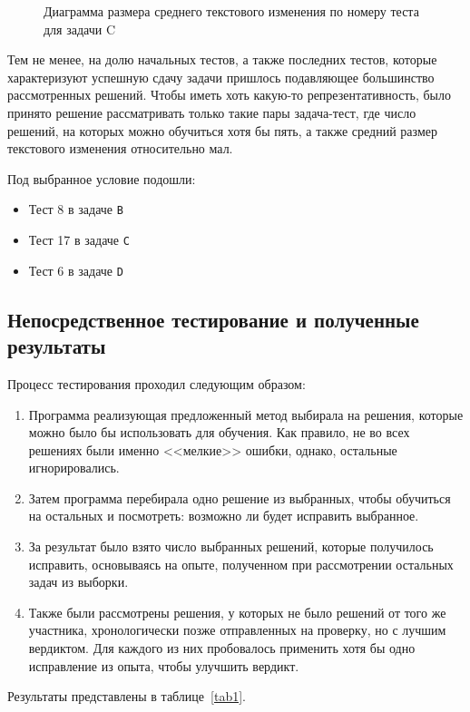 \begin{figure}[!h] 
\caption{Диаграмма размера среднего текстового изменения по номеру теста для задачи C}\label{fig3} 
\centering
{}

\end{figure}

Тем не менее, на долю начальных тестов, а также последних тестов, которые характеризуют успешную сдачу задачи пришлось подавляющее
большинство рассмотренных решений. Чтобы иметь хоть какую-то репрезентативность, было принято решение рассматривать только такие пары
задача-тест, где число решений, на которых можно обучиться хотя бы пять, а также средний размер текстового изменения относительно
мал.

Под выбранное условие подошли:
\begin{itemize}
    \item Тест 8 в задаче \texttt{B}
    \item Тест 17 в задаче \texttt{C}
    \item Тест 6 в задаче \texttt{D}
\end{itemize}

\subsection{Непосредственное тестирование и полученные результаты}

Процесс тестирования проходил следующим образом:
\begin{enumerate}
\item Программа реализующая предложенный метод выбирала на решения, которые можно было бы использовать для обучения.
    Как правило, не во всех решениях были именно <<мелкие>> ошибки, однако, остальные игнорировались.
\item Затем программа перебирала одно решение из выбранных, чтобы обучиться на остальных и посмотреть: возможно ли будет
    исправить выбранное.
\item За результат было взято число выбранных решений, которые получилось исправить, основываясь на опыте, полученном
    при рассмотрении остальных задач из выборки.
\item Также были рассмотрены решения, у которых не было решений от того же участника, хронологически
    позже отправленных на проверку, но с лучшим вердиктом. Для каждого из них пробовалось применить хотя бы одно исправление из опыта,
    чтобы улучшить вердикт.  
\end{enumerate}
Результаты представлены в таблице~\ref{tab1}.

